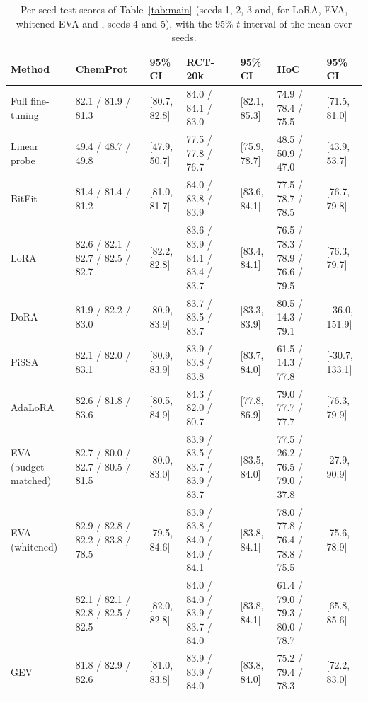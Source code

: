 \begin{table}[!ht]
\centering
\caption{Per-seed test scores of Table~\ref{tab:main} (seeds 1, 2, 3 and, for LoRA, EVA, whitened EVA and \method{}, seeds 4 and 5), with the 95\% $t$-interval of the mean over seeds.}
\label{tab:seeds}
\scriptsize
\setlength{\tabcolsep}{2.5pt}
\begin{tabular}{lllllll}
\toprule
Method & ChemProt & 95\% CI & RCT-20k & 95\% CI & HoC & 95\% CI \\
\midrule
Full fine-tuning & 82.1 / 81.9 / 81.3 & [80.7, 82.8] & 84.0 / 84.1 / 83.0 & [82.1, 85.3] & 74.9 / 78.4 / 75.5 & [71.5, 81.0] \\
Linear probe & 49.4 / 48.7 / 49.8 & [47.9, 50.7] & 77.5 / 77.8 / 76.7 & [75.9, 78.7] & 48.5 / 50.9 / 47.0 & [43.9, 53.7] \\
BitFit & 81.4 / 81.4 / 81.2 & [81.0, 81.7] & 84.0 / 83.8 / 83.9 & [83.6, 84.1] & 77.5 / 78.7 / 78.5 & [76.7, 79.8] \\
LoRA & 82.6 / 82.1 / 82.7 / 82.5 / 82.7 & [82.2, 82.8] & 83.6 / 83.9 / 84.1 / 83.4 / 83.7 & [83.4, 84.1] & 76.5 / 78.3 / 78.9 / 76.6 / 79.5 & [76.3, 79.7] \\
DoRA & 81.9 / 82.2 / 83.0 & [80.9, 83.9] & 83.7 / 83.5 / 83.7 & [83.3, 83.9] & 80.5 / 14.3 / 79.1 & [-36.0, 151.9] \\
PiSSA & 82.1 / 82.0 / 83.1 & [80.9, 83.9] & 83.9 / 83.8 / 83.8 & [83.7, 84.0] & 61.5 / 14.3 / 77.8 & [-30.7, 133.1] \\
AdaLoRA & 82.6 / 81.8 / 83.6 & [80.5, 84.9] & 84.3 / 82.0 / 80.7 & [77.8, 86.9] & 79.0 / 77.7 / 77.7 & [76.3, 79.9] \\
EVA (budget-matched) & 82.7 / 80.0 / 82.7 / 80.5 / 81.5 & [80.0, 83.0] & 83.9 / 83.5 / 83.7 / 83.9 / 83.7 & [83.5, 84.0] & 77.5 / 26.2 / 76.5 / 79.0 / 37.8 & [27.9, 90.9] \\
EVA (whitened) & 82.9 / 82.8 / 82.2 / 83.8 / 78.5 & [79.5, 84.6] & 83.9 / 83.8 / 84.0 / 84.0 / 84.1 & [83.8, 84.1] & 78.0 / 77.8 / 76.4 / 78.8 / 75.5 & [75.6, 78.9] \\
\method{} & 82.1 / 82.1 / 82.8 / 82.5 / 82.5 & [82.0, 82.8] & 84.0 / 84.0 / 83.9 / 83.7 / 84.0 & [83.8, 84.1] & 61.4 / 79.0 / 79.3 / 80.0 / 78.7 & [65.8, 85.6] \\
GEV & 81.8 / 82.9 / 82.6 & [81.0, 83.8] & 83.9 / 83.9 / 84.0 & [83.8, 84.0] & 75.2 / 79.4 / 78.3 & [72.2, 83.0] \\
\bottomrule
\end{tabular}
\end{table}
